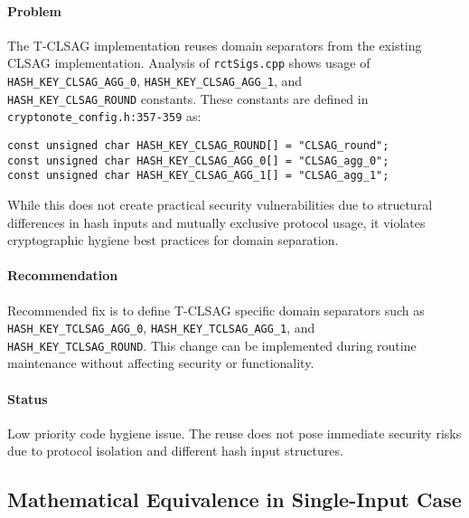 \documentclass{article}
\begin{document}
\paragraph{Problem}
The T-CLSAG implementation reuses domain separators from the existing CLSAG 
implementation.  Analysis of \texttt{rctSigs.cpp} shows usage of 
\texttt{HASH\_KEY\_CLSAG\_AGG\_0}, \texttt{HASH\_KEY\_CLSAG\_AGG\_1}, and \\
\texttt{HASH\_KEY\_CLSAG\_ROUND} constants.  These constants are defined in 
\texttt{cryptonote\_config.h:357-359} as:
\begin{verbatim}
const unsigned char HASH_KEY_CLSAG_ROUND[] = "CLSAG_round";
const unsigned char HASH_KEY_CLSAG_AGG_0[] = "CLSAG_agg_0";
const unsigned char HASH_KEY_CLSAG_AGG_1[] = "CLSAG_agg_1";
\end{verbatim}
While this does not create practical security vulnerabilities due to structural differences in hash 
inputs and mutually exclusive protocol usage, it violates cryptographic 
hygiene best practices for domain separation.

\paragraph{Recommendation}
Recommended fix is to define T-CLSAG specific domain separators such as 
\texttt{HASH\_KEY\_TCLSAG\_AGG\_0}, \texttt{HASH\_KEY\_TCLSAG\_AGG\_1}, and \\
\texttt{HASH\_KEY\_TCLSAG\_ROUND}.  This change can be implemented during 
routine maintenance without affecting security or functionality.

\paragraph{Status}
Low priority code hygiene issue.  The reuse does not pose immediate security 
risks due to protocol isolation and different hash input structures.

\subsection{Mathematical Equivalence in Single-Input Case}
\end{document}
